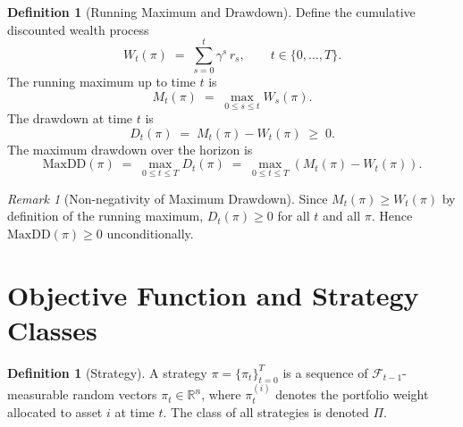 \documentclass[12pt,openany]{book}
\newcommand{\MaxDD}{\mathrm{MaxDD}}
\numberwithin{equation}{chapter}
\theoremstyle{plain}
\theoremstyle{definition}
\newtheorem{definition}[theorem]{Definition}
\theoremstyle{remark}
\newtheorem{remark}[theorem]{Remark}
\numberwithin{equation}{chapter}
\theoremstyle{plain}
\begin{document}
\begin{definition}[Running Maximum and Drawdown]
\label{def:drawdown}
Define the cumulative discounted wealth process
\begin{equation}
  W_t(\pi) \;=\; \sum_{s=0}^{t} \gamma^s\, r_s,
  \qquad t \in \{0,\ldots,T\}.
  \label{eq:wealth-process}
\end{equation}
The running maximum up to time $t$ is
\begin{equation}
  M_t(\pi) \;=\; \max_{0 \leq s \leq t} W_s(\pi).
  \label{eq:running-max-obj}
\end{equation}
The drawdown at time $t$ is
\begin{equation}
  D_t(\pi) \;=\; M_t(\pi) - W_t(\pi) \;\geq\; 0.
  \label{eq:drawdown-t}
\end{equation}
The maximum drawdown over the horizon is
\begin{equation}
  \MaxDD(\pi) \;=\; \max_{0 \leq t \leq T} D_t(\pi)
  \;=\; \max_{0 \leq t \leq T}\!\left(M_t(\pi) - W_t(\pi)\right).
  \label{eq:maxdd}
\end{equation}
\end{definition}

\begin{remark}[Non-negativity of Maximum Drawdown]
\label{rem:maxdd-nonneg}
Since $M_t(\pi) \geq W_t(\pi)$ by definition of the running maximum,
$D_t(\pi) \geq 0$ for all $t$ and all $\pi$.  Hence
$\MaxDD(\pi) \geq 0$ unconditionally.
\end{remark}

\section{Objective Function and Strategy Classes}
\label{sec:obj-def}

\begin{definition}[Strategy]
\label{def:strategy-obj}
A strategy $\pi = \{\pi_t\}_{t=0}^{T}$ is a sequence of
$\mathcal{F}_{t-1}$-measurable random vectors
$\pi_t \in \mathbb{R}^n$, where $\pi_t^{(i)}$ denotes the portfolio
weight allocated to asset $i$ at time $t$.  The class of all
strategies is denoted $\Pi$.
\end{definition}
\end{document}
